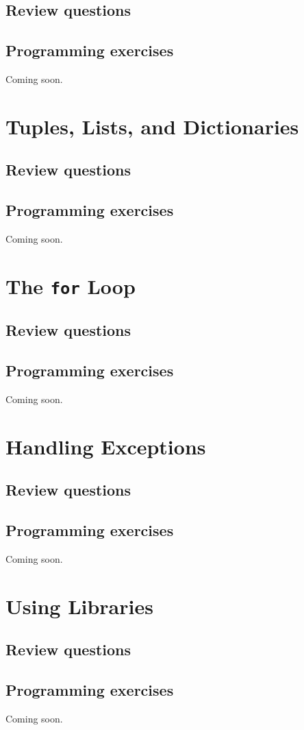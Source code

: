 \documentclass[article,A4,12pt]{llncs}
\begin{document}
\subsection{Review questions}

\subsection{Programming exercises}

Coming soon.


\section{Tuples, Lists, and Dictionaries}

\subsection{Review questions}

\subsection{Programming exercises}

Coming soon.


\section{The {\tt for} Loop} 

\subsection{Review questions}

\subsection{Programming exercises}

Coming soon.


\section{Handling Exceptions}

\subsection{Review questions}

\subsection{Programming exercises}

Coming soon.


\section{Using Libraries}

\subsection{Review questions}

\subsection{Programming exercises}

Coming soon.
\end{document}
